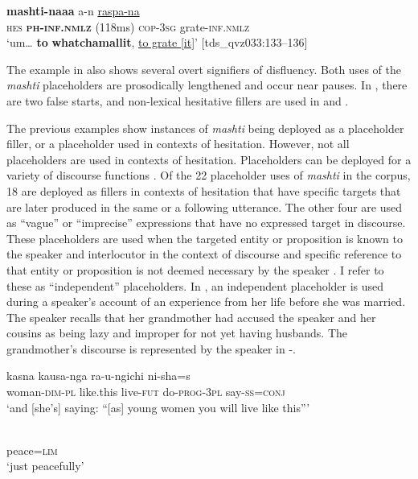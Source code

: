 \documentclass[output=paper]{langscibook}
\begin{document}
\ex \label{ex:rice:10d} {\textbf{mashti-naaa}} {a-n}  {\uline{raspa-na}}\\
{\textsc{hes}}  {{\textbf{\textsc{ph-inf.nmlz}}} \textsc{(118}ms)}    {\textsc{cop-3sg}}  {grate-\textsc{inf.nmlz}}\\
\glt  ‘um… \textbf{to} \textbf{whatchamallit}, \uline{to grate [it]}’ [tds\_qvz033:133--136]
\z\z

The example in  also shows several overt signifiers of disfluency. Both uses of the \textit{mashti} placeholders are prosodically lengthened and occur near pauses. In , there are two false starts, and non-lexical hesitative fillers are used in  and . 

The previous examples show instances of \textit{mashti} being deployed as a placeholder filler, or a placeholder used in contexts of hesitation. However, not all placeholders are used in contexts of hesitation. Placeholders can be deployed for a variety of discourse functions \citep{Enfield2003}. Of the 22 placeholder uses of \textit{mashti} in the corpus, 18 are deployed as fillers in contexts of hesitation that have specific targets that are later produced in the same or a following utterance. The other four are used as “vague” or “imprecise” expressions that have no expressed target in discourse. These placeholders are used when the targeted entity or proposition is known to the speaker and interlocutor in the context of discourse and specific reference to that entity or proposition is not deemed necessary by the speaker \citep[26]{Podlesskaya2010}. I refer to these as “independent” placeholders. In , an independent placeholder is used during a speaker’s account of an experience from her life before she was married. The speaker recalls that her grandmother had accused the speaker and her cousins as being lazy and improper for not yet having husbands. The grandmother’s discourse is represented by the speaker in -.

\ea%
\label{ex:rice:11}
\ea \label{ex:rice:11a}

 {kasna} {kausa-nga} {ra-u-ngichi} {ni-sha=s}\\
{woman\textsc{{}-dim-pl}}  {like.this}  {live-\textsc{fut}}  {do-\textsc{prog-3pl}}  {say-\textsc{ss=conj}}\\
\glt ‘and [she’s] saying: “[as] young women you will live like this”'
\medskip

\ex \label{ex:rice:11b}
 \\
{peace=\textsc{lim}}\\
\glt `just peacefully'
\medskip
\end{document}
